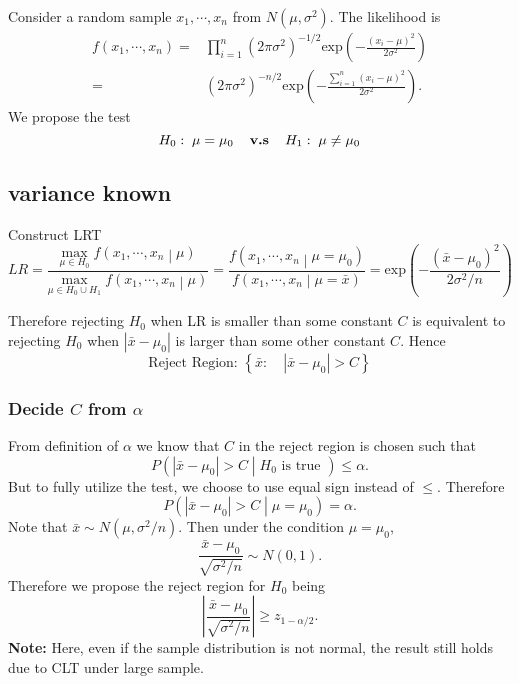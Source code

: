 \documentclass[a4paper,12pt]{article}
\begin{document}
Consider a random sample $x_1, \cdots, x_n$ from $N\left(\mu, \sigma^2\right)$. The likelihood is
\[
  \begin{aligned}
    f\left(x_1, \cdots, x_n\right)
    =& \prod\limits_{i = 1}^n
    \left(2\pi\sigma^2\right)^{-1/2}
    \mathrm{exp}\left(
      -\frac{
        \left(x_i - \mu\right)^2
      }{2\sigma^2}
    \right)    \\
    =& \left(2\pi\sigma^2\right)^{-n / 2}
    \mathrm{exp}\left(
      -\frac{\sum\limits_{i = 1}^n\left(x_i - \mu\right)^2}{2\sigma^2}
    \right)
    .
  \end{aligned}
\]
We propose the test
\[
  H_0:\; \mu = \mu_0
  \textbf{\quad v.s\quad}
  H_1:\; \mu \neq \mu_0
\]
\subsection{variance known}
\label{sec:variance-known}

Construct LRT
\[
  LR = \frac{
    \underset{\mu\in H_0}{\mathrm{max}}\;
    f\left(x_1, \cdots, x_n\middle|\mu\right)
  }{
    \underset{\mu\in H_0\cup H_1}{\mathrm{max}}\;
    f\left(x_1, \cdots, x_n\middle|\mu\right)
  }
  =\frac{
    f\left(x_1, \cdots, x_n\middle|\mu = \mu_0\right)
  }{
    f\left(x_1, \cdots, x_n\middle|\mu = \bar{x}\right)
  }
  = \mathrm{exp}\left(
    -\frac{\left(\bar{x} - \mu_0\right)^2}{2\sigma^2 / n}
  \right)
\]

Therefore rejecting $H_0$ when LR is smaller than some constant $C$ is equivalent to rejecting $H_0$ when $\left|\bar{x} - \mu_0\right|$ is larger than some other constant $C$. Hence
\[
  \text{Reject Region: }
  \left\{
    \bar{x}
    :\quad
    \left|\bar{x}-\mu_0\right| > C
  \right\}
\]

\subsubsection{Decide $C$ from $\alpha$}
\label{sec:decide-c-from}

From definition of $\alpha$ we know that $C$ in the reject region is chosen such that
\[
  P\left(
    \left|\bar{x} - \mu_0\right| > C
    \middle| H_0\text{ is true }\right)
  \leq \alpha
  .
\]
But to fully utilize the test, we choose to use equal sign instead of $\leq$. Therefore
\[
  P\left(
    \left|\bar{x} - \mu_0\right| > C
    \middle| \mu = \mu_0
  \right)
  = \alpha
  .
\]
Note that $\bar{x}\sim N\left(\mu, \sigma^2 / n\right)$. Then under the condition $\mu = \mu_0$,
\[
  \frac{\bar{x} - \mu_0}{\sqrt{\sigma^2 / n}}
  \sim N\left(0, 1\right)
  .
\]
Therefore we propose the reject region for $H_0$ being
\[
  \left|
    \frac{\bar{x} - \mu_0}{\sqrt{\sigma^2 / n}}
  \right|
  \geq z_{1 - \alpha / 2}
  .
\]
\textbf{Note: } Here, even if the sample distribution is not normal, the result still holds due to CLT under large sample.
\end{document}
